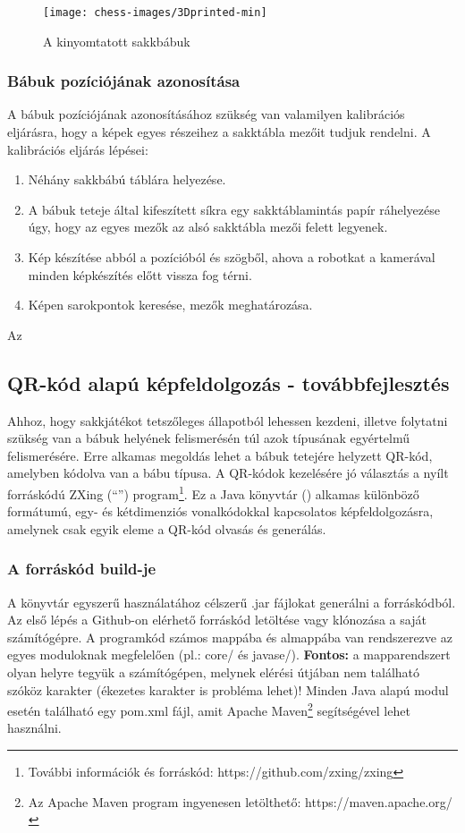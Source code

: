 \documentclass[../documentation.tex]{subfiles}
\begin{document}
\begin{figure}
\centering
\texttt{[image: chess-images/3Dprinted-min]}
\caption{A kinyomtatott sakkbábuk}
\label{fig:3dprinted}
\end{figure}

\subsubsection{Bábuk pozíciójának azonosítása}
A bábuk pozíciójának azonosításához szükség van valamilyen kalibrációs eljárásra, hogy a képek egyes részeihez a sakktábla mezőit tudjuk rendelni. A kalibrációs eljárás lépései:

\begin{enumerate}
	\item Néhány sakkbábú táblára helyezése.
	\item A bábuk teteje által kifeszített síkra egy sakktáblamintás papír ráhelyezése úgy, hogy az egyes mezők az alsó sakktábla mezői felett legyenek.
	\item Kép készítése abból a pozícióból és szögből, ahova a robotkat a kamerával minden képkészítés előtt vissza fog térni.
	\item Képen sarokpontok keresése, mezők meghatározása.
\end{enumerate}

Az 

\subsection{QR-kód alapú képfeldolgozás - továbbfejlesztés} \label{qrsection}
Ahhoz, hogy sakkjátékot tetszőleges állapotból lehessen kezdeni, illetve folytatni szükség van a bábuk helyének felismerésén túl azok típusának egyértelmű felismerésére. Erre alkamas megoldás lehet a bábuk tetejére helyzett QR-kód, amelyben kódolva van a bábu típusa. A QR-kódok kezelésére jó választás a nyílt forráskódú ZXing (``'') program\footnote{További információk és forráskód: https://github.com/zxing/zxing}. Ez a Java könyvtár () alkamas különböző formátumú, egy- és kétdimenziós vonalkódokkal kapcsolatos képfeldolgozásra, amelynek csak egyik eleme a QR-kód olvasás és generálás.

\subsubsection{A forráskód build-je}
A könyvtár egyszerű használatához célszerű .jar fájlokat generálni a forráskódból. Az első lépés a Github-on elérhető forráskód letöltése vagy klónozása a saját számítógépre. A programkód számos mappába és almappába van rendszerezve az egyes moduloknak megfelelően (pl.: core/ és javase/). \textbf{Fontos:} a mapparendszert olyan helyre tegyük a számítógépen, melynek elérési útjában nem található szóköz karakter (ékezetes karakter is probléma lehet)! Minden Java alapú modul esetén található egy pom.xml fájl, amit Apache Maven\footnote{Az Apache Maven program ingyenesen letölthető: https://maven.apache.org/} segítségével lehet használni.
\end{document}
